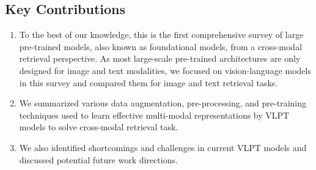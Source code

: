 \subsection{Key Contributions}
\begin{enumerate}
    \item To the best of our knowledge, this is the first comprehensive survey of large pre-trained models, also known as foundational models, from a cross-modal retrieval perspective. As most large-scale pre-trained architectures are only designed for image and text modalities, we focused on vision-language models in this survey and compared them for image and text retrieval tasks.
    \item We summarized various data augmentation, pre-processing, and pre-training techniques used to learn effective multi-modal representations by VLPT models to solve cross-modal retrieval task.
    \item We also identified shortcomings and challenges in current VLPT models and discussed potential future work directions.
\end{enumerate}

